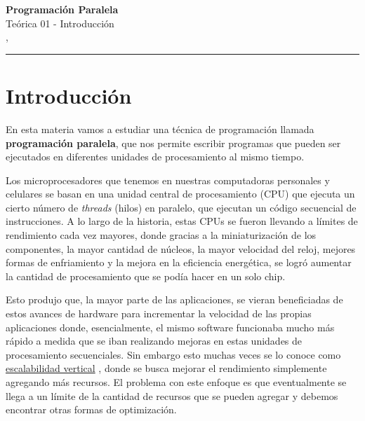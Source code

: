 



\begin{center}
    \LARGE\textbf{Programación Paralela} \\
    \Large{Teórica 01 - Introducción} \\
    \normalsize{\currentsemester, \currentyear} \\
    \vspace{1em}
    \hrule
\end{center}

\vspace{1em}


\section*{Introducción}
\label{sec:introduccion}

En esta materia vamos a estudiar una técnica de programación llamada \textbf{programación paralela}, que nos permite
escribir programas que pueden ser ejecutados en diferentes unidades de procesamiento al mismo tiempo.

Los microprocesadores que tenemos en nuestras computadoras personales y celulares se basan en una unidad central de
procesamiento (CPU) que ejecuta un cierto número de \textit{threads} (hilos) en paralelo, que ejecutan un código
secuencial de instrucciones. A lo largo de la historia, estas CPUs se fueron llevando a límites de rendimiento cada vez
mayores, donde gracias a la miniaturización de los componentes, la mayor cantidad de núcleos, la mayor velocidad del
reloj, mejores formas de enfriamiento y la mejora en la eficiencia energética, se logró aumentar la cantidad de
procesamiento que se podía hacer en un solo chip.

Esto produjo que, la mayor parte de las aplicaciones, se vieran beneficiadas de estos avances de hardware para
incrementar la velocidad de las propias aplicaciones donde, esencialmente, el mismo software funcionaba mucho más rápido
a medida que se iban realizando mejoras en estas unidades de procesamiento secuenciales. Sin embargo esto muchas veces
se lo conoce como \href{https://es.wikipedia.org/wiki/Escalabilidad#Escalabilidad_vertical}{escalabilidad vertical} ,
donde se busca mejorar el rendimiento simplemente agregando más recursos. El problema con este enfoque es que
eventualmente se llega a un límite de la cantidad de recursos que se pueden agregar y debemos encontrar otras formas de
optimización.

